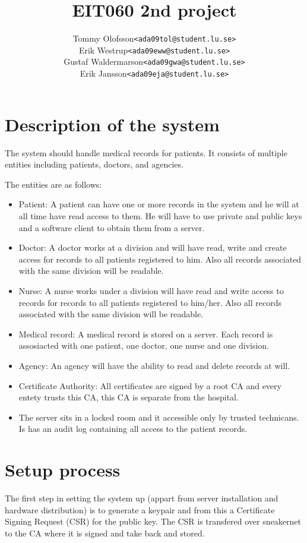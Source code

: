 \documentclass[10pt, a4paper]{article}
\title{EIT060 2nd project}
\date{}
\author{
	\begin{tabular}{l l}
		Tommy Olofsson & \texttt{<ada09tol@student.lu.se>}\\
		Erik Westrup & \texttt{<ada09eww@student.lu.se>}\\
		Gustaf Waldermarson & \texttt{<ada09gwa@student.lu.se>}\\
		Erik Jansson & \texttt{<ada09eja@student.lu.se>}
	\end{tabular}
}
\begin{document}
\begin{titlepage}
\maketitle
\begin{center}
\end{center}

\thispagestyle{empty}
\end{titlepage}
\setcounter{page}{2}
\section{Description of the system}
The system should handle medical records for patients. It consists of multiple entities including patients, doctors, and agencies. %

The entities are as follows:
\begin{itemize}
\item Patient: A patient can have one or more records in the system and he will at all time have read access to them. He will have to use private and public keys and a software client to obtain them from a server. 
\item Doctor: A doctor works at a division and will have read, write and create access for records to all patients registered to him. Also all records associated with the same division will be readable.
\item Nurse: A nurse works under a division will have read and write access to records for records to all patients registered to him/her. Also all records associated with the same division will be readable.
\item Medical record: A medical record is stored on a server. Each record is assosiacted with one patient, one doctor, one nurse and one division.
\item Agency: An agency will have the ability to read and delete records at will.
\item Certificate Authority: All certificates are signed by a root CA and every entety trusts this CA, this CA is
separate from the hospital.
\item The server sits in a locked room and it accessible only by trusted technicans. Is has an audit log containing all access to the patient records.
\end{itemize}

\section{Setup process}
The first step in setting the system up (appart from server installation and hardware distribution) is to generate a keypair and from this a Certificate Signing Request (CSR) for the public key. The CSR is transfered over sneakernet to the CA where it is signed and take back and stored. 
\end{document}
